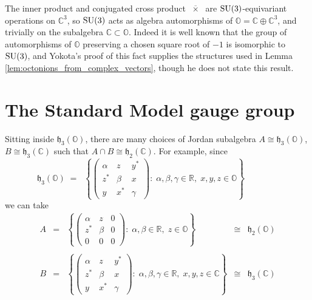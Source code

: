 \documentclass{article}
\theoremstyle{plain}
\theoremstyle{remark}
\theoremstyle{definition}
\newcommand{\R}{{\mathbb R}}  %
\newcommand{\C}{{\mathbb C}}  %
\renewcommand{\O}{{\mathbb O}}  %
\newcommand{\SU}{{\rm SU}}    %
\newcommand{\h}{\mathfrak{h}}  %
\begin{document}
The inner product and conjugated cross product $\; \overline{\! \times \!} \; $ are $\SU(3)$-equivariant operations on $\C^3$, so $\SU(3)$ acts as algebra automorphisms of $\O = \C \oplus \C^3$, and trivially on the subalgebra $\C \subset \O$.  Indeed it is well known that the group of automorphisms of $\O$ preserving a chosen square root of $-1$ is isomorphic to $\SU(3)$, and Yokota's proof of this fact \cite[Thm.\ 1.9.1]{Yokota} supplies the structures used in Lemma \ref{lem:octonions_from_complex_vectors}, though he does not state this result.

\section{The Standard Model gauge group}
\label{sec:standard}

Sitting inside $\h_3(\O)$, there are many choices of Jordan subalgebra $A \cong \h_3(\O)$, $B \cong \h_3(\C)$ such that $A \cap B \cong \h_2(\C)$.  For example, since
\[ \h_3(\O) \; = \;\; \left\{  \left( \begin{array}{ccc}  
                         \alpha  &  z  & y^*    \\  
                         z^*       & \beta & x      \\ 
                         y       & x^*   & \gamma   
\end{array} \right) : \; \alpha,\beta,\gamma \in \R, \; x,y,z \in \O \right\} \qquad \qquad \]
we can take
\begin{equation}
\label{eq:choice_of_AB}
\begin{array}{cclccc} 
 A &=& \left\{  \left( \begin{array}{ccc}  
                         \alpha  &  z  & 0    \\  
                         z^*       & \beta & 0      \\ 
                         0    & 0   & 0   
\end{array} \right) : \; \alpha,\beta \in \R, \; z \in \O \right\} &\cong& \h_2(\O) \\ \\
 B &=& \left\{  \left( \begin{array}{ccc}  
                         \alpha  &  z  & y^*    \\  
                         z^*       & \beta & x      \\ 
                         y       & x^*   & \gamma   
\end{array} \right) : \; \alpha,\beta,\gamma \in \R, \; x,y,z \in \C \right\} &\cong& \h_3(\C) 
\end{array}
\end{equation}
\end{document}
